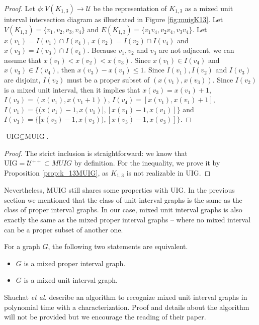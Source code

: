 \begin{proof}
Let $\phi : V(K_{1,3}) \to \mathcal{U}$ be the representation of $K_{1,3}$ as a mixed unit interval intersection diagram as illustrated in Figure \ref{fig:muigK13}. Let $V(K_{1,3}) = \{v_1, v_2, v_3, v_4\}$ and $E(K_{1,3}) = \{v_1v_4, v_2v_4, v_3v_4\}$. Let $x(v_1) = I(v_1) \cap I(v_4)$, $x(v_2) = I(v_2) \cap I(v_4)$ and $x(v_3) = I(v_3) \cap I(v_4)$. Because $v_1, v_2$ and $v_3$ are not adjacent, we can assume that $x(v_1) < x(v_2) < x(v_3)$. Since $x(v_1) \in I(v_4)$ and $x(v_3) \in I(v_4)$, then $x(v_3) - x(v_1) \leqslant 1$. Since $I(v_1), I(v_2)$ and $I(v_3)$ are disjoint, $I(v_2)$ must be a proper subset of $(x(v_1), x(v_3))$. Since $I(v_2)$ is a mixed unit interval, then it implies that $x(v_3) = x(v_1) + 1$, $I(v_2) = (x(v_1), x(v_1+1))$, $I(v_4) = [x(v_1), x(v_1)+1]$, $I(v_1) = \{(x(v_1) -1, x(v_1)], [x(v_1) -1, x(v_1)]\}$ and $I(v_3) = \{[x(v_3) -1, x(v_3)), [x(v_3) -1, x(v_3)]\}$.
\end{proof}

\begin{theorem}
  $\text{UIG} \subsetneq \text{MUIG}$.
\end{theorem}

\begin{proof}
  The strict inclusion is straightforward: we know that $\text{UIG} = \mathcal{U}^{++} \subset MUIG$ by definition. For the inequality, we prove it by Proposition \ref{prop:k_13MUIG}, as $K_{1,3}$ is not realizable in UIG.
\end{proof}

Nevertheless, MUIG still shares some properties with UIG. In the previous section we mentioned that the class of unit interval graphs is the same as the class of proper interval graphs. In our case, mixed unit interval graphs is also exactly the same as the mixed proper interval graphs -- where no mixed interval can be a proper subset of another one.

\begin{theorem}
  For a graph $G$, the following two statements are equivalent.
  \begin{itemize}
    \item $G$ is a mixed proper interval graph.
    \item $G$ is a mixed unit interval graph.
  \end{itemize}
\end{theorem}

Shuchat \textit{et al.} \cite{shuchatUnitMixedInterval2014} describe an algorithm to recognize mixed unit interval graphs in polynomial time with a characterization. Proof and details about the algorithm will not be provided but we encourage the reading of their paper.

